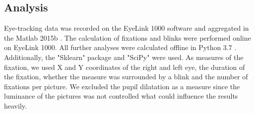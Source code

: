 \documentclass[a4paper,man,natbib,floatsintext]{apa6}
\begin{document}
\subsection{Analysis} Eye-tracking data was recorded on the EyeLink 1000 software and aggregated in the Matlab 2015b \citep{Mathworks2015}.  The calculation of fixations and blinks were performed online on EyeLink 1000. All further analyses were calculated offline in Python 3.7 \citep{Python2018}. Additionally, the "Sklearn" package \citep{Pedregosa2012b} and "SciPy" \citep{Oliphant2007} were used. %
As measures of the fixation, we used X and Y coordinates of the right and left eye, the duration of the fixation, whether the measure was surrounded by a blink and the number of fixations per picture. We excluded the pupil dilatation as a measure since the luminance of the pictures was not controlled what could influence the results heavily.\\
\end{document}
